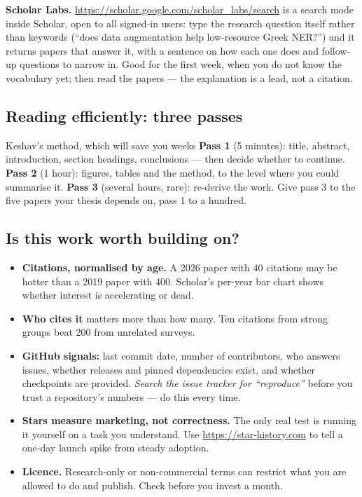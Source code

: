 \documentclass[11pt,a4paper]{article}
\begin{document}
\textbf{Scholar Labs.} \url{https://scholar.google.com/scholar_labs/search} is a search mode
inside Scholar, open to all signed-in users: type the research question itself
rather than keywords (``does data augmentation help low-resource Greek
NER?'') and it returns papers that answer it, with a sentence on how each one
does and follow-up questions to narrow in. Good for the first week, when you
do not know the vocabulary yet; then read the papers --- the explanation is a
lead, not a citation.

\subsection{Reading efficiently: three passes}

\begin{cbox}{Keshav's method, which will save you weeks}
\textbf{Pass 1} (5 minutes): title, abstract, introduction, section headings,
conclusions --- then decide whether to continue. \textbf{Pass 2} (1 hour):
figures, tables and the method, to the level where you could summarise it.
\textbf{Pass 3} (several hours, rare): re-derive the work. Give pass 3 to the
five papers your thesis depends on, pass 1 to a hundred.
\end{cbox}

\subsection{Is this work worth building on?}

\begin{itemize}
  \item \textbf{Citations, normalised by age.} A 2026 paper with 40 citations
        may be hotter than a 2019 paper with 400. Scholar's per-year bar chart
        shows whether interest is accelerating or dead.
  \item \textbf{Who cites it} matters more than how many. Ten citations from
        strong groups beat 200 from unrelated surveys.
  \item \textbf{GitHub signals:} last commit date, number of contributors, who
        answers issues, whether releases and pinned dependencies exist, and
        whether checkpoints are provided. \emph{Search the issue tracker for
        ``reproduce''} before you trust a repository's numbers --- do this
        every time.
  \item \textbf{Stars measure marketing, not correctness.} The only real test
        is running it yourself on a task you understand. Use
        \url{https://star-history.com} to tell a one-day launch spike from
        steady adoption.
  \item \textbf{Licence.} Research-only or non-commercial terms can restrict
        what you are allowed to do and publish. Check before you invest a
        month.
\end{itemize}
\end{document}
